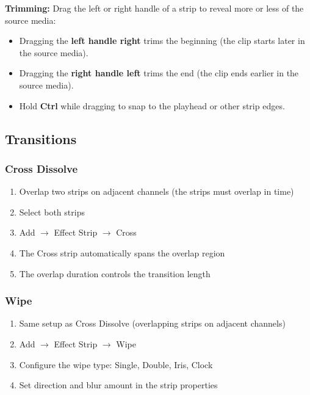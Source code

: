 \textbf{Trimming:} Drag the left or right handle of a strip to reveal more or less of the source media:

\begin{itemize}[leftmargin=2em]
  \item Dragging the \textbf{left handle right} trims the beginning (the clip starts later in the source media).
  \item Dragging the \textbf{right handle left} trims the end (the clip ends earlier in the source media).
  \item Hold \textbf{Ctrl} while dragging to snap to the playhead or other strip edges.
\end{itemize}

\subsection{Transitions}

\subsubsection{Cross Dissolve}

\begin{enumerate}[leftmargin=2em]
  \item Overlap two strips on adjacent channels (the strips must overlap in time)
  \item Select both strips
  \item Add $\rightarrow$ Effect Strip $\rightarrow$ Cross
  \item The Cross strip automatically spans the overlap region
  \item The overlap duration controls the transition length
\end{enumerate}

\subsubsection{Wipe}

\begin{enumerate}[leftmargin=2em]
  \item Same setup as Cross Dissolve (overlapping strips on adjacent channels)
  \item Add $\rightarrow$ Effect Strip $\rightarrow$ Wipe
  \item Configure the wipe type: Single, Double, Iris, Clock
  \item Set direction and blur amount in the strip properties
\end{enumerate}

